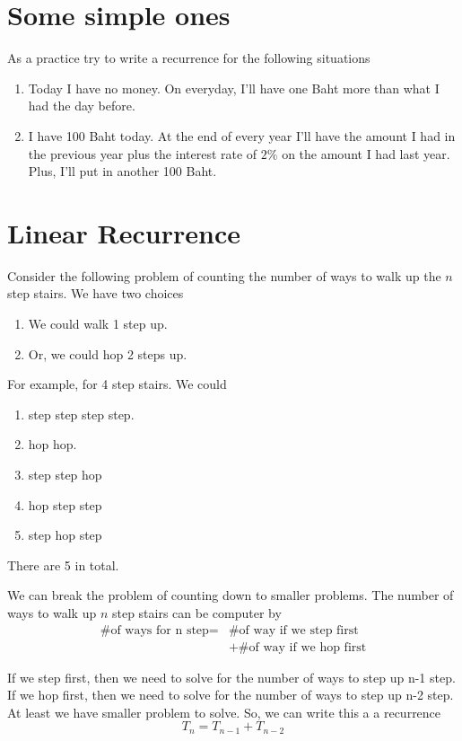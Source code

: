 \documentclass[a4paper, 12pt]{article}
\begin{document}
\begin{multicols}{2}
\section*{Some simple ones}
As a practice try to write a recurrence for the following situations
\begin{enumerate}
	\item Today I have no money. On everyday, I'll have one Baht more than what I had the day before. 
	\item I have 100 Baht today. At the end of every year I'll have the amount I had in the previous year plus the interest rate of $2\%$ on the amount I had last year. Plus, I'll put in another 100 Baht.
\end{enumerate}

\section*{Linear Recurrence}
Consider the following problem of counting the number of ways to walk up the $n$ step stairs. We have two choices
\begin{enumerate}
	\item We could walk 1 step up.
	\item Or, we could hop 2 steps up.
\end{enumerate}

For example, for 4 step stairs. We could
\begin{enumerate}[1.]
	\item step step step step.
	\item hop hop.
	\item step step hop
	\item hop step step
	\item step hop step
\end{enumerate}
There are 5 in total.

We can break the problem of counting down to smaller problems. The number of ways to walk up $n$ step stairs can be computer by
\begin{align*}
	\text{\# of ways for n step} = &\text{\# of way if we step first}\\ 
	&+ \text{\# of way if we hop first}
\end{align*}

If we step first, then we need to solve for the number of ways to step up n-1 step. If we hop first, then we need to solve for the number of ways to step up n-2 step. At least we have smaller problem to solve. So, we can write this a a recurrence
\[
	T_n = T_{n-1} + T_{n-2}
\]


\end{multicols}
\end{document}
